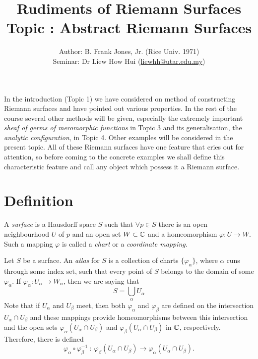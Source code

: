 \documentclass[a4paper,11pt]{article}
\newcounter{topic}
\begin{document}
\title{{\sc Rudiments of Riemann Surfaces\\
    Topic \thetopic{}: Abstract Riemann Surfaces}}
\author{Author: B. Frank Jones, Jr. (Rice Univ. 1971)\\
Seminar: Dr Liew How Hui (\url{liewhh@utar.edu.my})}
\date{}

\maketitle


In the introduction (Topic 1) we have considered on method of
constructing Riemann surfaces and have pointed out various properties.
In the rest of the course several other methods will be given,
especially the extremely important \emph{sheaf of germs of meromorphic
  functions} in Topic 3 and its generalisation, the \emph{analytic
  configuration}, in Topic 4.  Other examples will be considered in
the present topic.  All of these Riemann surfaces have one feature
that cries out for attention, so before coming to the concrete
examples we shall define this characteristic feature and call any
object which possess it a Riemann surface.

\section{Definition}

\begin{defn}
  A \emph{surface} is a Hausdorff space $S$ such that $\forall p \in
  S$ there is an open neighbourhood $U$ of $p$ and an open set $W
  \subset {\mathbb C}$ and a homeomorphism $\varphi : U \to W$. Such a
  mapping $\varphi$ is called a \emph{chart} or a \emph{coordinate
    mapping}.
\end{defn}

\begin{defn}
  Let $S$ be a surface.  An \emph{atlas} for $S$ is a collection of
  charts $\{\varphi_\alpha\}$, where $\alpha$ runs through some index
  set, such that every point of $S$ belongs to the domain of some
  $\varphi_\alpha$.  If $\varphi_\alpha : U_\alpha \to W_\alpha$, then
  we are saying that
  $$
  S = \bigcup_\alpha U_\alpha
  $$
  Note that if $U_\alpha$ and $U_\beta$ meet, then both
  $\varphi_\alpha$ and $\varphi_\beta$ are defined on the intersection
  $U_\alpha \cap U_\beta$ and these mappings provide homeomorphisms
  between this intersection and the open sets $\varphi_\alpha(U_\alpha
  \cap U_\beta)$ and $\varphi_\beta(U_\alpha \cap U_\beta)$ in ${\mathbb C}$,
  respectively.   Therefore, there is defined 
  $$
  \varphi_\alpha \circ \varphi_\beta^{-1} ~:~ \varphi_\beta(U_\alpha
  \cap U_\beta) \to \varphi_\alpha(U_\alpha \cap U_\beta).
  $$
\end{defn}
\end{document}
